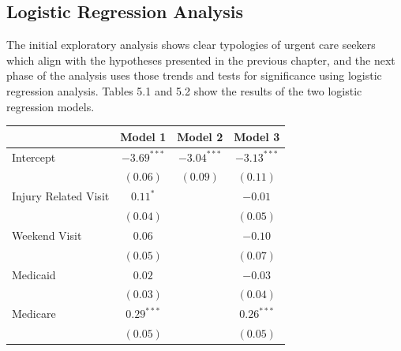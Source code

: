 \documentclass[12pt,twoside]{reedthesis}
\begin{document}
  \subsection*{Logistic Regression
  Analysis}\label{logistic-regression-analysis}
  
  The initial exploratory analysis shows clear typologies of urgent care
  seekers which align with the hypotheses presented in the previous
  chapter, and the next phase of the analysis uses those trends and tests
  for significance using logistic regression analysis. Tables 5.1 and 5.2
  show the results of the two logistic regression models.
  
  \singlespacing
  
  \begin{table}
  \begin{center}
  \begin{small}
  \begin{tabular}{l c c c }
  \hline
   & Model 1 & Model 2 & Model 3 \\
  \hline
  Intercept                     & $\mathbf{-3.69}^{***}$ & $\mathbf{-3.04}^{***}$ & $\mathbf{-3.13}^{***}$ \\
                                & $(0.06)$               & $(0.09)$               & $(0.11)$               \\
  Injury Related Visit          & $0.11^{*}$             &                        & $-0.01$                \\
                                & $(0.04)$               &                        & $(0.05)$               \\
  Weekend Visit                 & $0.06$                 &                        & $-0.10$                \\
                                & $(0.05)$               &                        & $(0.07)$               \\
  Medicaid                      & $0.02$                 &                        & $-0.03$                \\
                                & $(0.03)$               &                        & $(0.04)$               \\
  Medicare                      & $\mathbf{0.29}^{***}$  &                        & $\mathbf{0.26}^{***}$  \\
                                & $(0.05)$               &                        & $(0.05)$               \\

\end{tabular}
\end{small}
\end{center}
\end{table}
\end{document}

